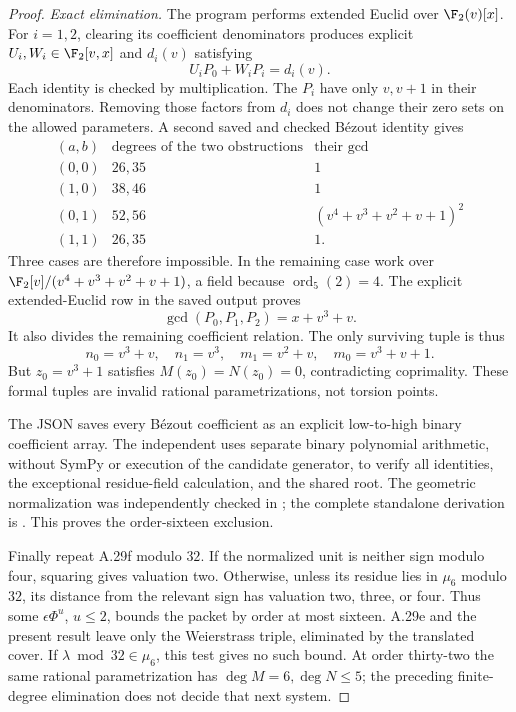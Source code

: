 \begin{proof}
\emph{Exact elimination.}
The program 
performs extended Euclid over $\F_2(v)[x]$. For $i=1,2$,
clearing its coefficient denominators produces explicit
$U_i,W_i\in\F_2[v,x]$ and $d_i(v)$ satisfying
\[
 U_iP_0+W_iP_i=d_i(v).
\]
Each identity is checked by multiplication. The $P_i$
have only $v,v+1$ in their denominators. Removing those
factors from $d_i$ does not change their zero sets on
the allowed parameters. A second saved and checked
B\'ezout identity gives
\[
\begin{array}{c|c|c}
(a,b)&\text{degrees of the two obstructions}&\text{their gcd}\\\hline
(0,0)&26,35&1\\
(1,0)&38,46&1\\
(0,1)&52,56&(v^4+v^3+v^2+v+1)^2\\
(1,1)&26,35&1 .
\end{array}
\]
Three cases are therefore impossible. In the remaining
case work over $\F_2[v]/(v^4+v^3+v^2+v+1)$, a field
because $\operatorname{ord}_5(2)=4$. The explicit
extended-Euclid row in the saved output proves
\[
 \gcd(P_0,P_1,P_2)=x+v^3+v.
\]
It also divides the remaining coefficient relation.
The only surviving tuple is thus
\[
 n_0=v^3+v,\quad n_1=v^3,\quad
 m_1=v^2+v,\quad m_0=v^3+v+1.
\]
But $z_0=v^3+1$ satisfies $M(z_0)=N(z_0)=0$,
contradicting coprimality. These formal tuples are
invalid rational parametrizations, not torsion points.

The JSON saves every B\'ezout coefficient as an explicit
low-to-high binary coefficient array. The independent
uses separate binary polynomial arithmetic, without
SymPy or execution of the candidate generator, to
verify all identities, the exceptional residue-field
calculation, and the shared root. The geometric
normalization was independently checked in
;
the complete standalone derivation is
.
This proves the order-sixteen exclusion.

Finally repeat A.29f modulo $32$. If the normalized
unit is neither sign modulo four, squaring gives
valuation two. Otherwise, unless its residue lies
in $\mu_6$ modulo $32$, its distance from the relevant
sign has valuation two, three, or four. Thus some
$\epsilon\Phi^u$, $u\le2$, bounds the packet by order
at most sixteen. A.29e and the present result leave
only the Weierstrass triple, eliminated by the
translated cover. If $\lambda\bmod32\in\mu_6$,
this test gives no such bound. At order thirty-two
the same rational parametrization has
$\deg M=6,\deg N\le5$; the preceding finite-degree
elimination does not decide that next system.
\end{proof}

